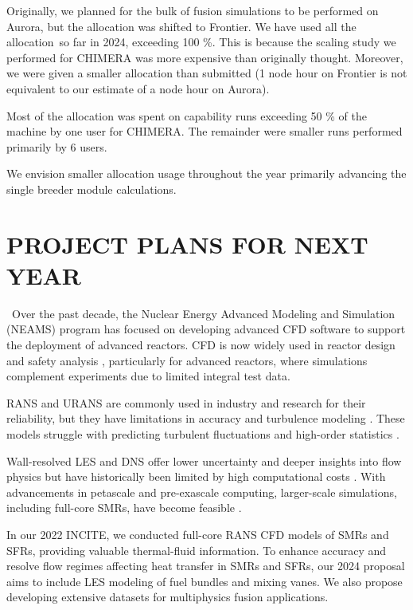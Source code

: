 Originally, we planned for the bulk of fusion simulations to be performed on Aurora, but the allocation was shifted to Frontier.
We have used all the allocation\ so far in 2024, exceeding 100 \%. This is because the scaling study we performed for CHIMERA was more expensive than originally thought. Moreover, we were given a smaller allocation than submitted (1 node hour on Frontier is not equivalent to our estimate of a node hour on Aurora).

Most of the allocation was spent on capability runs exceeding 50 \% of the machine by one user for CHIMERA. The remainder were smaller runs performed primarily by 6 users. 

We envision smaller allocation usage throughout the year primarily advancing the single breeder module calculations.



\vspace{-.25in}
\section{PROJECT PLANS FOR NEXT YEAR} %
\vspace{-.2in}
\
Over the past decade, the Nuclear Energy Advanced Modeling and Simulation (NEAMS) program \cite{sofu2017us} has focused on developing advanced CFD software to support the deployment of advanced reactors. CFD is now widely used in reactor design and safety analysis \cite{roelofs2018thermal}, particularly for advanced reactors, where simulations complement experiments due to limited integral test data.

RANS \cite{conner2010cfd} and URANS are commonly used in industry and research for their reliability, but they have limitations in accuracy and turbulence modeling \cite{merzari2010numerical}. These models struggle with predicting turbulent fluctuations and high-order statistics \cite{yuan2017flow}.

Wall-resolved LES and DNS offer lower uncertainty and deeper insights into flow physics but have historically been limited by high computational costs \cite{grotzbach1999direct}. With advancements in petascale and pre-exascale computing, larger-scale simulations, including full-core SMRs, have become feasible \cite{merzari2017large,Fang2021}.

In our 2022 INCITE, we conducted full-core RANS CFD models of SMRs and SFRs, providing valuable thermal-fluid information. To enhance accuracy and resolve flow regimes affecting heat transfer in SMRs and SFRs, our 2024 proposal aims to include LES modeling of fuel bundles and mixing vanes. We also propose developing extensive datasets for multiphysics fusion applications.

